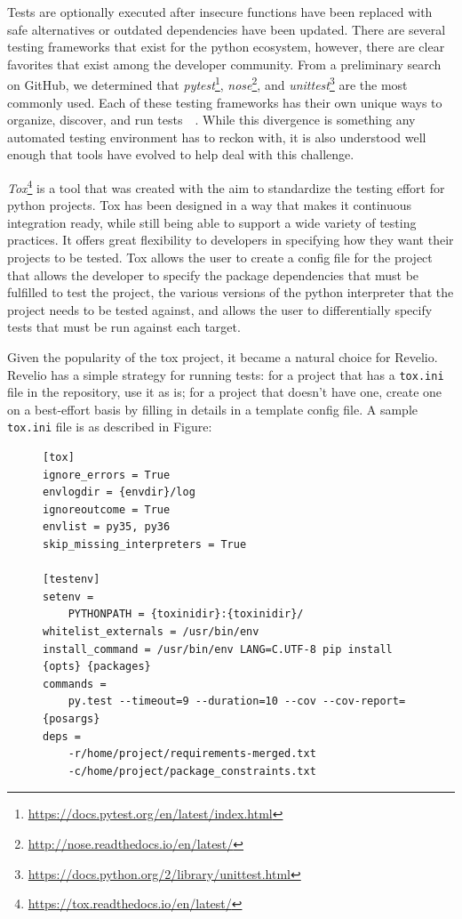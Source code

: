Tests are optionally executed after insecure functions have been replaced with safe alternatives or outdated dependencies have been updated. There are several testing frameworks that exist for the python ecosystem, however, there are clear favorites that exist among the developer community. From a preliminary search on GitHub, we determined that \emph{pytest}\footnote{\url{https://docs.pytest.org/en/latest/index.html}}, \emph{nose}\footnote{\url{http://nose.readthedocs.io/en/latest/}}, and \emph{unittest}\footnote{\url{https://docs.python.org/2/library/unittest.html}} are the most commonly used. Each of these testing frameworks has their own unique ways to organize, discover, and run tests~\cite{nosetests}~\cite{pytests}. While this divergence is something any automated testing environment has to reckon with, it is also understood well enough that tools have evolved to help deal with this challenge.

\emph{Tox}\footnote{\url{https://tox.readthedocs.io/en/latest/}} is a tool that was created with the aim to standardize the testing effort for python projects. Tox has been designed in a way that makes it continuous integration ready, while still being able to support a wide variety of testing practices. It offers great flexibility to developers in specifying how they want their projects to be tested. Tox allows the user to create a config file for the project that allows the developer to specify the package dependencies that must be fulfilled to test the project, the various versions of the python interpreter that the project needs to be tested against, and allows the user to differentially specify tests that must be run against each target. 

Given the popularity of the tox project, it became a natural choice for Revelio. Revelio has a simple strategy for running tests: for a project that has a \texttt{tox.ini} file in the repository, use it as is; for a project that doesn't have one, create one on a best-effort basis by filling in details in a template config file. A sample \texttt{tox.ini} file is as described in Figure: 

\begin{figure}[!h]
    \centering
    \begin{lstlisting}[caption={Sample tox.ini file},captionpos=b, label={lst:tox}]
[tox]
ignore_errors = True
envlogdir = {envdir}/log
ignoreoutcome = True
envlist = py35, py36
skip_missing_interpreters = True

[testenv]
setenv =
    PYTHONPATH = {toxinidir}:{toxinidir}/
whitelist_externals = /usr/bin/env
install_command = /usr/bin/env LANG=C.UTF-8 pip install {opts} {packages}
commands =
    py.test --timeout=9 --duration=10 --cov --cov-report= {posargs}
deps =
    -r/home/project/requirements-merged.txt
    -c/home/project/package_constraints.txt
\end{lstlisting}
\end{figure}


